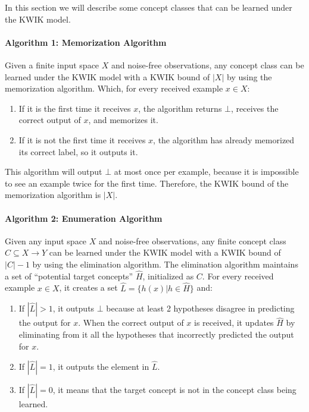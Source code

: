 In this section we will describe some concept classes that can be learned under
the KWIK model.

\paragraph{Algorithm 1: Memorization Algorithm}
Given a finite input space $X$ and noise-free observations, any concept class
can be learned under the KWIK model with a KWIK bound of $|X|$ by using the
memorization algorithm. Which, for every received example $x \in X$:
\begin{enumerate}
  \item If it is the first time it receives $x$, the algorithm returns $\bot$,
  receives the correct output of $x$, and memorizes it.
  \item If it is not the first time it receives $x$, the algorithm has already
  memorized its correct label, so it outputs it.
\end{enumerate}

This algorithm will output $\bot$ at most once per example, because it is
impossible to see an example twice for the first time. Therefore, the KWIK bound
of the memorization algorithm is $|X|$. \\

\paragraph{Algorithm 2: Enumeration Algorithm}
Given any input space $X$ and noise-free observations, any finite concept class $C \subseteq X \to Y$
can be learned under the KWIK model with a KWIK bound of $|C| - 1$ by using the
elimination algorithm. The elimination algorithm maintains a set of ``potential
target concepts'' $\hat{H}$, initialized as $C$. For every received example
$x \in X$, it creates a set $\hat{L} = \{ h(x) | h \in \hat{H} \}$ and:
\begin{enumerate}
  \item If $|\hat{L}| > 1$, it outputs $\bot$ because at least 2 hypotheses
  disagree in predicting the output for $x$. When the correct output of $x$ is received, it
  updates $\hat{H}$ by eliminating from it all the hypotheses that
  incorrectly predicted the output for $x$.
  \item If $|\hat{L}| = 1$, it outputs the element in $\hat{L}$.
  \item If $|\hat{L}| = 0$, it means that the target concept is not in
  the concept class being learned.
\end{enumerate}

